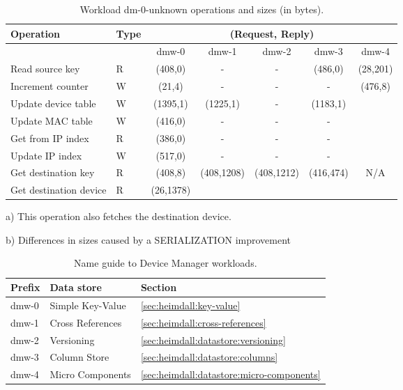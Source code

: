 \begin{table}[ht]
\small
\centering 
\begin{threeparttable}
\begin{tabular}{ll ccccc}
 Operation & Type &  \multicolumn{5}{c}{ (Request, Reply) } \\  \midrule
&  & dmw-0 & dmw-1  & dmw-2 & dmw-3 & dmw-4 \\ \toprule 
Read source key & R & (408,0) & - & - & (486,0) & (28,201)\tnote{a}\\
Increment counter & W & (21,4) & -  & - & - & \multirow{5}{*}{(476,8)} \\
Update device table & W & (1395,1) & (1225,1)\tnote{b}  & - &
(1183,1) & \\
Update MAC  table & W & (416,0) & - & - & -
& \\
Get from IP index & R & (386,0) & - & - & - & \\
Update IP index  & W & (517,0) & - & - & - & \\
Get destination key & R & (408,8) &
\multirow{2}{*}{(408,1208)}\tnote{b} & \multirow{2}{*}{(408,1212)} &
\multirow{2}{*}{(416,474)} & \multirow{2}{*}{N/A}  \\ 
Get destination device & R & (26,1378)  &  & & \\\bottomrule
\end{tabular}
\caption[Workload dm-0-unknown operations]{Workload dm-0-unknown operations
  and sizes (in bytes).}\label{table:dm-unknown-optimizations}
\begin{tablenotes}
\item [a)] This operation also fetches the destination device.
\item [b)] Differences in sizes caused by a SERIALIZATION improvement 
\end{tablenotes}
\end{threeparttable}
\end{table}


\begin{table}
\small
\begin{tabular}{lll} 
    Prefix &  Data store & Section\\\toprule
    dmw-0 & Simple Key-Value  & \ref{sec:heimdall:key-value}  \\
    dmw-1 & Cross References  & \ref{sec:heimdall:cross-references} \\
    dmw-2 & Versioning & \ref{sec:heimdall:datastore:versioning} \\
    dmw-3 & Column Store & \ref{sec:heimdall:datastore:columns} \\
    dmw-4 & Micro Components & \ref{sec:heimdall:datastore:micro-components} \\ 
  \end{tabular}
  \caption[Name guide to Device Manager workloads]{Name guide to
    Device Manager workloads.}
  \label{table:names:dm}
\end{table}


